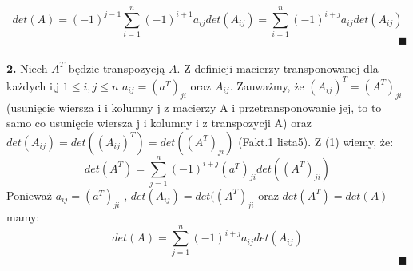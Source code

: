 \documentclass[a4paper]{article}
\begin{document}
\begin{adjustwidth}{30pt}{30pt}
$$ det(A) = (-1)^{j-1}\sum_{i=1}^{n}(-1)^{i + 1}a_{ij}det(A_{ij}) = \sum_{i=1}^{n}(-1)^{i + j}a_{ij}det(A_{ij})$$
$\hspace{420pt}\blacksquare$
\\\\
\textbf{2.} Niech $A^{T}$ będzie transpozycją $A$. Z definicji macierzy transponowanej dla każdych i,j $ 1 \le i,j \le n $ $a_{ij} = (a^{T})_{ji}$ oraz $A_{ij}$. Zauważmy, że $(A_{ij})^{T} = (A^{T})_{ji}$ (usunięcie wiersza i i kolumny j z macierzy A i przetransponowanie jej, to to samo co usunięcie wiersza j i kolumny i z transpozycji A) oraz $det(A_{ij}) = det((A_{ij})^{T}) = det( (A^{T})_{ji})$ (Fakt.1 lista5). Z (1) wiemy, że:
$$ det(A^{T}) = \sum_{j=1}^{n}(-1)^{i + j}(a^{T})_{ji}det((A^{T})_{ji}) $$
Ponieważ $a_{ij} = (a^{T})_{ji}$ , $det(A_{ij}) = det( (A^{T})_{ji}$ oraz $det(A^{T}) = det(A)$ mamy:
$$ det(A) = \sum_{j=1}^{n}(-1)^{i + j}a_{ij}det(A_{ij})$$
$\hspace{420pt}\blacksquare$

\end{adjustwidth}
\end{document}
